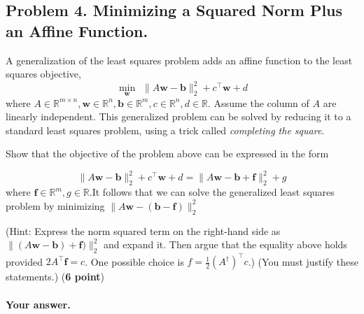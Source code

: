 \documentclass[11pt]{scrartcl}
\newcommand{\bw}{\mathbf{w}}
\newcommand{\bb}{\mathbf{b}}
\begin{document}
	
	
	\subsection*{Problem 4. Minimizing a Squared Norm Plus an Affine Function.}
	A generalization of the least squares
	problem adds an affine function to the least squares objective,
	\[
	\min_{\bw} \hspace{5pt} \|A \bw - \bb\|_2^2 + c^\intercal \bw + d
	\]
	where $A \in \mathbb{R}^{m \times n}, \bw\in \mathbb{R}^n, \bb \in \mathbb{R}^m, c \in \mathbb{R}^n, d \in \mathbb{R}$. Assume the column of $A$ are linearly independent.
	This generalized problem can be solved by reducing it to a standard least squares problem, using a trick called \textit{completing the square}.
	
	Show that the objective of the problem above can be expressed in the form
	
	\[
	\|A \bw - \bb\|_2^2 + c^\intercal \bw + d = \|A \bw - \bb + \mathbf{f}\|_2^2 + g
	\]
	where $ \mathbf{f} \in \mathbb{R}^m, g \in \mathbb{R}$.It follows that we can solve the generalized least squares problem by minimizing $\|A \bw - (\bb - \mathbf{f})\|_2^2$
	
	(Hint: Express the norm squared term on the right-hand side as $\| (A \bw - \bb) + \mathbf{f})\|_2^2$ and
	expand it. Then argue that the equality above holds provided $2A^\intercal \textbf{f} = c$. One possible choice is $f = \frac{1}{2}(A^\dagger)^\intercal c$.) (You must justify these statements.) (\textbf{6 point})
	\paragraph{Your answer.}
	
\end{document}

